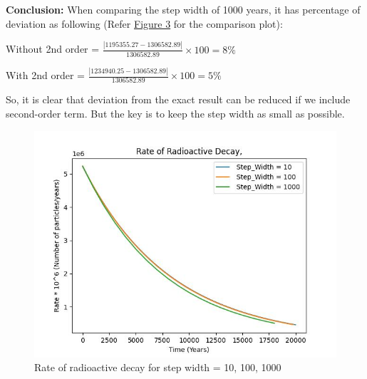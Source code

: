 \documentclass[11pt]{article}
\begin{document}
\begin{justify}
\textbf{Conclusion:} When comparing the step width of 1000 years, it has percentage of deviation as following (Refer \hyperref[fig:Rate of radioactive decay for step width = 1000, with 2nd order term]{Figure 3} for the comparison plot):

Without 2nd order = $\frac{\left|1195355.27 - 1306582.89\right|}{1306582.89} \times 100 = 8\%$

With 2nd order = $\frac{\left|1234940.25 - 1306582.89\right|}{1306582.89} \times 100 = 5\% $

So, it is clear that deviation from the exact result can be reduced if we include second-order term. But the key is to keep the step width as small as possible.

\begin{figure}[b]
    \centering
    \includegraphics[width=\textwidth, height=\textheight, keepaspectratio]{Carbon_plot_10_100_1000.jpeg}
    \caption{Rate of radioactive decay for step width = 10, 100, 1000}
    \label{fig:Rate of radioactive decay for step width = 10, 100, 1000}
\end{figure}


\end{justify}
\end{document}
